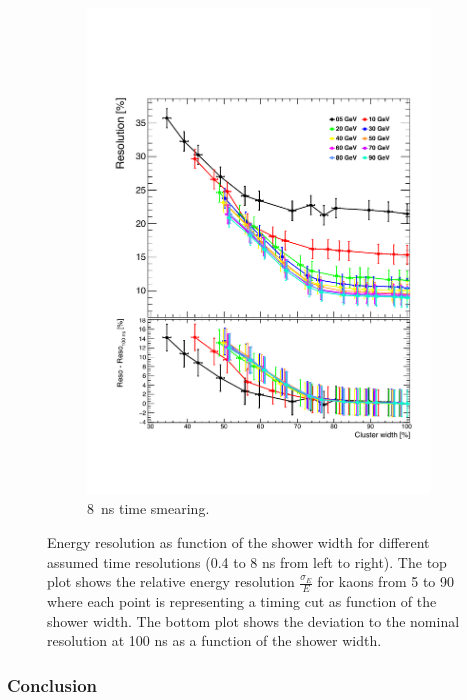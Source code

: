 \begin{figure}[t]
\begin{subfigure}[t]{0.5\textwidth}
    \includegraphics[width=1\linewidth]{chap6/fig_TimingILD/8ns_Smearing/ShowerWidth_Resolution_Smearing8ns}
    \vspace{-6ex}
    \caption{\SI{8}{\nano\second} time smearing.}  \label{fig:WidthReso8ns}
  \end{subfigure}
  \caption{Energy resolution as function of the shower width for different assumed time resolutions (0.4 to 8 ns from left to right). The top plot shows the relative energy resolution $\frac{\sigma_{E}}{E}$ for kaons from 5 to 90 \GeV where each point is representing a timing cut as function of the shower width. The bottom plot shows the deviation to the nominal resolution at 100 ns as a function of the shower width.}
\end{figure}

\subsubsection{Conclusion}

